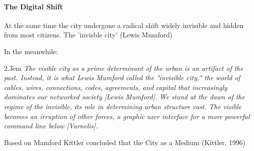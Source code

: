 \paragraph{The Digital Shift}

At the same time the city undergone a radical shift widely invisible and hidden from most citizens. The 'invisble city' (Lewis Mumford) 


In the meanwhile: 


\begin{singlespace}
	\leftskip2.3em
		\rightskip\leftskip
			\textit{\small The visible city as a prime determinant of the urban is an artifact of the past. Instead, it is what Lewis Mumford called the "invisible city," the world of cables, wires, connections, codes, agreements, and capital that increasingly dominates our networked society [Lewis Mumford]. We stand at the dawn of the regime of the invisible, its role in determining urban structure vast. The visible becomes an irruption of other forces, a graphic user interface for a more powerful command line below [Varnelis].}
\end{singlespace}


Based on Mamford Kittler concluded that the City as a Medium (Kittler, 1996)
 

